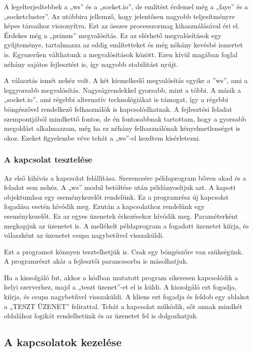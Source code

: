 \documentclass[bibliography=totocnumbered]{article}
\begin{document}
A legelterjedtebbek a „ws'' és a „socket.io'', de említést érdemel még a
„faye'' és a „socketcluster''. Az utóbbira jellemző, hogy jelentősen
nagyobb teljesítményre képes társaihoz viszonyítva. Ezt az összes
processzormag kihasználásával éri el. Érdekes még a „primus''
megvalósítás. Ez az elérhető megvalósítások egy gyűjteménye, tartalmazza
az eddig említetteket és még néhány kevésbé ismertet is. Egyszerűen
válthatunk a megvalósítások között. Ezen kívül magában foglal néhány
sajátos fejlesztést is, így nagyobb stabilitást nyújt.

A választás ismét nehéz volt. A két kiemelkedő megvalósítás egyike a
''ws'', ami a leggyorsabb megvalósítás. Nagyságrendekkel gyorsabb, mint
a többi. A másik a „socket.io'', ami régebbi alternatív technológiákat
is támogat, így a régebbi böngészővel rendelkező felhasználók is
kapcsolódhatnak. A fejlesztési feladat szempontjából mindkettő fontos,
de én fontosabbnak tartottam, hogy a gyorsabb megoldást alkalmazzam, még
ha ez néhány felhasználónak kényelmetlenséget is okoz. Ezeket figyelembe
véve tehát a „ws''-el kezdtem kísérletezni.


\subsubsection{A kapcsolat tesztelése}

Az első kihívás a kapcsolat felállítása. Szerencsére példaprogram bőven
akad és a feladat sem nehéz. A „ws'' modul betöltése után példányosítjuk
azt. A kapott objektumhoz egy eseménykezelőt rendelünk. Ez a programrész
új kapcsolat fogadása esetén hívódik meg. Ezután a kapcsolathoz
rendelünk egy eseménykezelőt. Ez az egyes üzenetek érkezésekor hívódik
meg. Paraméterként megkapjuk az üzenetet is. A mellékelt példaprogram a
fogadott üzenetet kiírja, és válaszként az üzenetet csupa nagybetűvel
visszaküldi.

Ezt a programot könnyen tesztelhetjük is. Csak egy böngészőre van
szükségünk. A programrészt akár a fejlesztői parancssorba is
másolhatjuk.

Ha a kiszolgáló fut, akkor a kódban mutatott program sikeresen
kapcsolódik a helyi szerverhez, majd a „teszt üzenet''-et el is küldi. A
kiszolgáló ezt fogadja, kiírja, és csupa nagybetűvel visszaküldi. A
kliens ezt fogadja és feldob egy ablakot a „TESZT ÜZENET'' felirattal.
Tehát a kapcsolat működik, sőt annak mindkét oldalához logikát
rendelhetünk és az üzenetet fel is dolgozhatjuk.


\subsection{A kapcsolatok kezelése}
\end{document}
